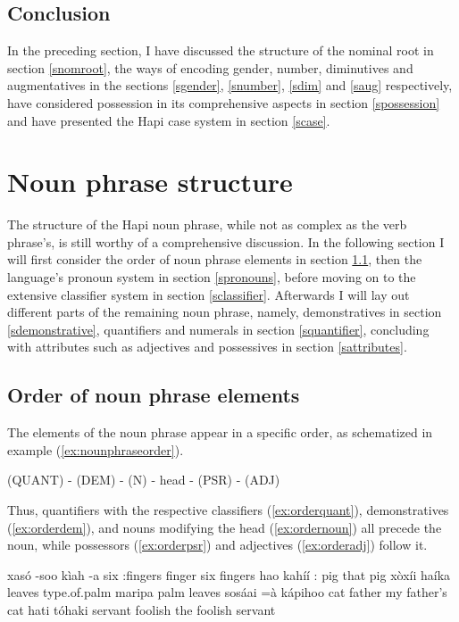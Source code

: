 \documentclass[a4paper, 12pt, oneside]{memoir}
\begin{document}
\subsection{Conclusion}
In the preceding section, I have discussed the structure of the nominal root in section \ref{snomroot}, the ways of encoding gender, number, diminutives and augmentatives in the sections \ref{sgender}, \ref{snumber}, \ref{sdim} and \ref{saug} respectively, have considered possession in its comprehensive aspects in section \ref{spossession} and have presented the Hapi case system in section \ref{scase}.
\section{Noun phrase structure}\label{snounphrase}
The structure of the Hapi noun phrase, while not as complex as the verb phrase's, is still worthy of a comprehensive discussion. In the following section I will first consider the order of noun phrase elements in section \ref{snounorder}, then the language's pronoun system in section \ref{spronouns}, before moving on to the extensive classifier system in section \ref{sclassifier}. Afterwards I will lay out different parts of the remaining noun phrase, namely, demonstratives in section \ref{sdemonstrative}, quantifiers and numerals in section \ref{squantifier}, concluding with attributes such as adjectives and possessives in section \ref{sattributes}. 
\subsection{Order of noun phrase elements}\label{snounorder}
The elements of the noun phrase appear in a specific order, as schematized in example (\ref{ex:nounphraseorder}).
\begin{examples}
\ex \label{ex:nounphraseorder}
(QUANT) - (DEM) - (N) - head -  (PSR) - (ADJ) 
\end{examples}
Thus, quantifiers with the respective classifiers (\ref{ex:orderquant}), demonstratives (\ref{ex:orderdem}), and nouns modifying the head (\ref{ex:ordernoun}) all precede the noun, while possessors (\ref{ex:orderpsr}) and adjectives (\ref{ex:orderadj}) follow it.
\begin{examples}
\ex \label{ex:orderquant}
\bits xasó -soo kìah -a
\gloss six {\Cl}:fingers finger {\Pl}
\tr six fingers
\ex \label{ex:orderdem}
\bits hao kahíí
\gloss {\Dem}:{\Dist} pig
\tr that pig
\ex \label{ex:ordernoun}
\bits xòxíi haíka
\gloss leaves type.of.palm
\tr maripa palm leaves
\ex \label{ex:orderpsr}
\bits sosáai =à kápihoo
\gloss cat {\Link} father
\tr my father's cat
\ex \label{ex:orderadj}
\bits hati tóhaki
\gloss servant foolish
\tr the foolish servant
\end{examples}
\end{document}
